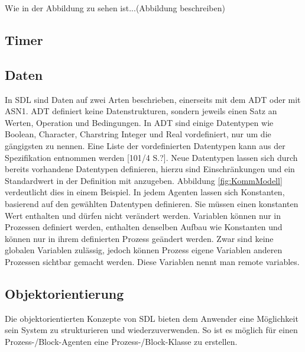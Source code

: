 Wie in der Abbildung zu sehen ist...(Abbildung beschreiben)

\subsection{Timer}

\subsection{Daten}
\label{ssc:Daten}
In \ac{SDL} sind Daten auf zwei Arten beschrieben, einerseits mit dem \acs{ADT} oder mit \ac{ASN1}. \ac{ADT} definiert keine 
Datenstrukturen, sondern jeweils einen Satz an Werten, Operation und Bedingungen. In \ac{ADT} sind einige Datentypen wie Boolean, Character, Charstring Integer und Real vordefiniert, nur um die gängigsten zu nennen. Eine Liste der vordefinierten Datentypen kann aus der Spezifikation entnommen werden [101/4 S.?]. Neue Datentypen lassen sich durch bereits vorhandene Datentypen definieren, hierzu sind Einschränkungen und ein Standardwert in der Definition mit anzugeben. Abbildung \ref{fig:KommModell} verdeutlicht dies in einem Beispiel. In jedem Agenten lassen sich Konstanten, basierend auf den gewählten Datentypen definieren. Sie müssen einen konstanten Wert enthalten und dürfen nicht verändert werden. Variablen können nur in Prozessen definiert werden, enthalten denselben Aufbau wie Konstanten und können nur in ihrem definierten Prozess geändert werden. Zwar sind keine globalen Variablen zulässig, jedoch können Prozess eigene Variablen anderen Prozessen sichtbar gemacht werden. Diese Variablen nennt man remote variables.

\subsection{Objektorientierung} 
\label{ssc:Vererbung}
Die objektorientierten Konzepte von \ac{SDL} bieten dem Anwender eine Möglichkeit sein System zu strukturieren und wiederzuverwenden. So ist es möglich für einen Prozess-/Block-Agenten eine Prozess-/Block-Klasse zu erstellen.

